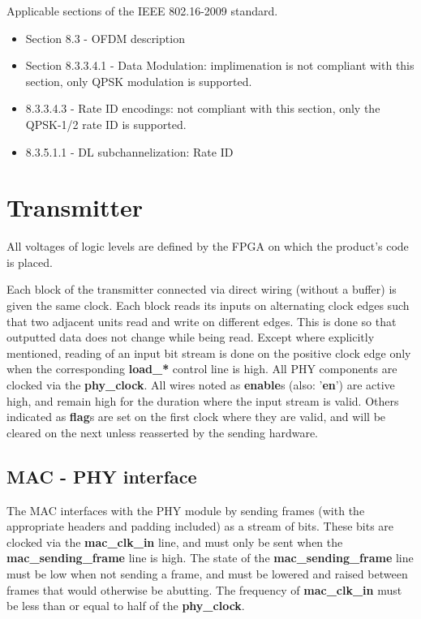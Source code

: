 \documentclass[10pt,twocolumn]{article}
\begin{document}
	Applicable sections of the IEEE 802.16-2009 standard.
	\begin{itemize}
		\item Section 8.3 - OFDM description
		\item Section 8.3.3.4.1 - Data Modulation: implimenation
			is not compliant with this section, only QPSK
			modulation is supported.
		\item 8.3.3.4.3 - Rate ID encodings: not compliant with
			this section, only the QPSK-1/2 rate ID is supported.
		\item 8.3.5.1.1 - DL subchannelization: Rate ID
	\end{itemize}

\section{Transmitter}
All voltages of logic levels are defined by the FPGA on which the product's
code is placed.

Each block of the transmitter connected via direct wiring (without a
buffer) is given the same clock. Each block reads its inputs on alternating
clock edges such that two adjacent units read and write on different edges.
This is done so that outputted data does not change while being read.
Except where explicitly mentioned, reading of an input bit stream is done
on the positive clock edge only when the corresponding \textbf{load\_*}
control line is high.  All PHY components are clocked via the
\textbf{phy\_clock}. All wires noted as \textbf{enable}s (also:
'\textbf{en}') are active high, and remain high for the duration where the
input stream is valid. Others indicated as \textbf{flag}s are set on the
first clock where they are valid, and will be cleared on the next unless
reasserted by the sending hardware.

	\subsection{MAC - PHY interface}
	\label{sec:mac_phy}

	The MAC interfaces with the PHY module by sending frames (with
	the appropriate headers and padding included) as a stream of bits. These bits
	are clocked via the \textbf{mac\_clk\_in} line, and must only be sent when the
	\textbf{mac\_sending\_frame} line is high. The state of the
	\textbf{mac\_sending\_frame} line must be low when not sending a frame, and
	must be lowered and raised between frames that would otherwise be abutting. The
	frequency of \textbf{mac\_clk\_in} must be less than or equal to half of the
	\textbf{phy\_clock}.
\end{document}
